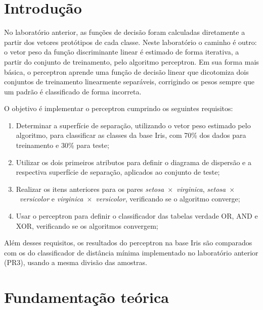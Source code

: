 \documentclass[12pt,a4paper]{article}
\begin{document}
\tableofcontents
\thispagestyle{empty}
\newpage

\section{Introdução}

No laboratório anterior, as funções de decisão foram calculadas diretamente a partir dos vetores protótipos de cada classe. Neste laboratório o caminho é outro: o vetor peso da função discriminante linear é estimado de forma iterativa, a partir do conjunto de treinamento, pelo algoritmo perceptron. Em sua forma mais básica, o perceptron aprende uma função de decisão linear que dicotomiza dois conjuntos de treinamento linearmente separáveis, corrigindo os pesos sempre que um padrão é classificado de forma incorreta.

O objetivo é implementar o perceptron cumprindo os seguintes requisitos:
\begin{enumerate}
  \item Determinar a superfície de separação, utilizando o vetor peso estimado pelo algoritmo, para classificar as classes da base Iris, com 70\% dos dados para treinamento e 30\% para teste;
  \item Utilizar os dois primeiros atributos para definir o diagrama de dispersão e a respectiva superfície de separação, aplicados ao conjunto de teste;
  \item Realizar os itens anteriores para os pares \emph{setosa}~$\times$~\emph{virginica}, \emph{setosa}~$\times$~\emph{versicolor} e \emph{virginica}~$\times$~\emph{versicolor}, verificando se o algoritmo converge;
  \item Usar o perceptron para definir o classificador das tabelas verdade OR, AND e XOR, verificando se os algoritmos convergem;
\end{enumerate}

Além desses requisitos, os resultados do perceptron na base Iris são comparados com os do classificador de distância mínima implementado no laboratório anterior (PR3), usando a mesma divisão das amostras.

\section{Fundamentação teórica}\label{sec:teoria}
\end{document}
